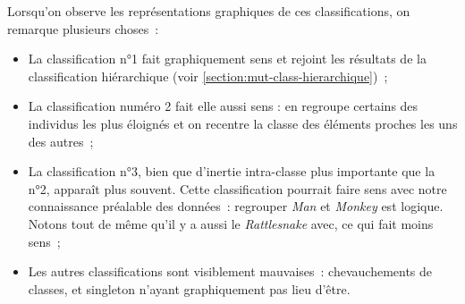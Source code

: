 \documentclass[a4paper,10pt]{report}
\begin{document}
Lorsqu'on observe les représentations graphiques de ces classifications, on remarque plusieurs choses~:
\begin{itemize}
	\item La classification n°1 fait graphiquement sens et rejoint les résultats de la classification hiérarchique (voir \autoref{section:mut-class-hierarchique})~;
	\item La classification numéro 2 fait elle aussi sens : en regroupe certains des individus les plus éloignés et on recentre la classe des éléments proches les uns des autres~;
	\item La classification n°3, bien que d'inertie intra-classe plus importante que la n°2, apparaît plus souvent. Cette classification pourrait faire sens avec notre connaissance préalable des données~: regrouper \textit{Man} et \textit{Monkey} est logique. Notons tout de même qu'il y a aussi le \textit{Rattlesnake} avec, ce qui fait moins sens~;
	\item Les autres classifications sont visiblement mauvaises~: chevauchements de classes, et singleton n'ayant graphiquement pas lieu d'être.
\end{itemize}
\end{document}
